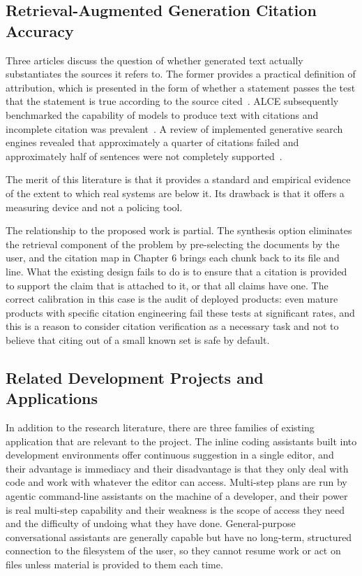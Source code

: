 \documentclass{FastFyp}
\begin{document}
\subsection{Retrieval-Augmented Generation Citation Accuracy}
Three articles discuss the question of whether generated text actually substantiates the sources it refers to. The former provides a practical definition of attribution, which is presented in the form of whether a statement passes the test that the statement is true according to the source cited~\cite{ref:rashkin2023}. ALCE subsequently benchmarked the capability of models to produce text with citations and incomplete citation was prevalent~\cite{ref:gao2023}. A review of implemented generative search engines revealed that approximately a quarter of citations failed and approximately half of sentences were not completely supported~\cite{ref:liu2023}.

The merit of this literature is that it provides a standard and empirical evidence of the extent to which real systems are below it. Its drawback is that it offers a measuring device and not a policing tool.

The relationship to the proposed work is partial. The synthesis option eliminates the retrieval component of the problem by pre-selecting the documents by the user, and the citation map in Chapter 6 brings each chunk back to its file and line. What the existing design fails to do is to ensure that a citation is provided to support the claim that is attached to it, or that all claims have one. The correct calibration in this case is the audit of deployed products: even mature products with specific citation engineering fail these tests at significant rates, and this is a reason to consider citation verification as a necessary task and not to believe that citing out of a small known set is safe by default.

\subsection{Related Development Projects and Applications}
In addition to the research literature, there are three families of existing application that are relevant to the project. The inline coding assistants built into development environments offer continuous suggestion in a single editor, and their advantage is immediacy and their disadvantage is that they only deal with code and work with whatever the editor can access. Multi-step plans are run by agentic command-line assistants on the machine of a developer, and their power is real multi-step capability and their weakness is the scope of access they need and the difficulty of undoing what they have done. General-purpose conversational assistants are generally capable but have no long-term, structured connection to the filesystem of the user, so they cannot resume work or act on files unless material is provided to them each time.
\end{document}
